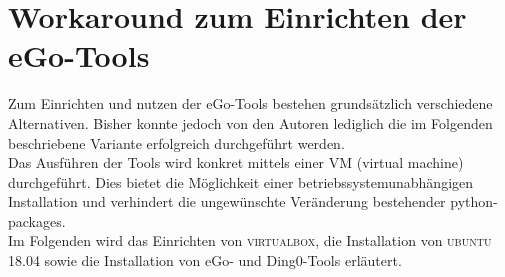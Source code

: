 \documentclass[
a4paper,     %
12pt         %
]{scrartcl}  %
\begin{document}
%	
%	
%	
%	
%	
%
%
%
\newpage
\section{Workaround zum Einrichten der eGo-Tools}
Zum Einrichten und nutzen der eGo-Tools bestehen grundsätzlich verschiedene Alternativen. Bisher konnte jedoch von den Autoren lediglich die im Folgenden beschriebene Variante erfolgreich durchgeführt werden.\\
Das Ausführen der Tools wird konkret mittels einer VM (virtual machine) durchgeführt. Dies bietet die Möglichkeit einer betriebssystemunabhängigen Installation und verhindert die ungewünschte Veränderung bestehender python-packages.\\   
Im Folgenden wird das Einrichten von \textsc{virtualbox}, die Installation von \textsc{ubuntu 18.04} sowie die Installation von eGo- und Ding0-Tools erläutert.
\end{document}
